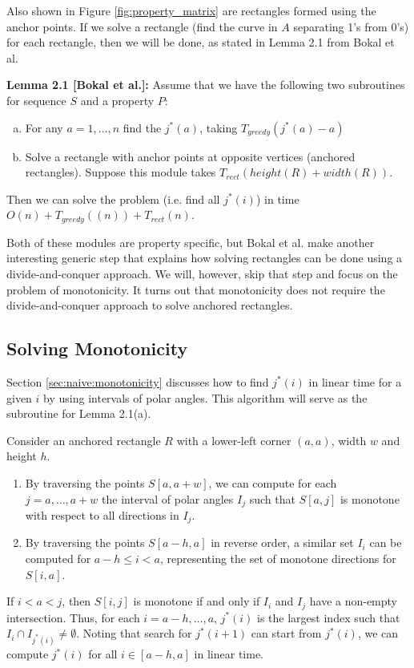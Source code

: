 \documentclass{article}
\begin{document}
Also shown in Figure \ref{fig:property_matrix} are rectangles formed
using the anchor points. If we solve a rectangle (find the curve
in $A$ separating 1's from 0's) for each rectangle, then we will
be done, as stated in Lemma 2.1 from Bokal et al.

\textbf{Lemma 2.1 [Bokal et al.]:} Assume that we have the following two subroutines for sequence $S$ and a property $P$:
\begin{enumerate}[(a)]
    \item For any $a = 1, \dots, n$ find the $j^*(a)$, taking $T_{greedy}(j^*(a) - a)$
    \item Solve a rectangle with anchor points at opposite vertices (anchored rectangles). Suppose this module takes $T_{rect}(height(R) + width(R))$.
\end{enumerate}
Then we can solve the problem (i.e. find all $j^*(i)$) in time $O(n) + T_{greedy}((n)) + T_{rect}(n)$.

Both of these modules are property specific, but Bokal et al. make
another interesting generic step that explains how solving rectangles
can be done using a divide-and-conquer approach. We will, however,
skip that step and focus on the problem of monotonicity. It turns
out that monotonicity does not require the divide-and-conquer
approach to solve anchored rectangles.

\subsection{Solving Monotonicity}
Section \ref{sec:naive:monotonicity} discusses how to find $j^*(i)$
in linear time for a given $i$ by using intervals of polar angles.
This algorithm will serve as the subroutine for Lemma 2.1(a).

Consider an anchored rectangle $R$ with a lower-left corner $(a, a)$, width $w$ and height $h$.
\begin{enumerate}[-]
	\item By traversing the points $S[a, a + w]$, we can compute
	for each $j = a, \dots, a + w$ the interval of polar angles
	$I_j$ such that $S[a, j]$ is monotone with respect to all
	directions in $I_j$.
	\item By traversing the points $S[a - h, a]$ in reverse
	order, a similar set $I_i$ can be computed for $a - h \leq
	i < a$, representing the set of monotone directions for
	$S[i, a]$.
\end{enumerate}

If $i < a < j$, then $S[i, j]$ is monotone if and only if $I_i$ and
$I_j$ have a non-empty intersection. Thus, for each $i = a - h,
\dots, a$, $j^*(i)$ is the largest index such that $I_i \cap
I_{j^*(i)} \neq \emptyset$.  Noting that search for $j^*(i+1)$ can
start from $j^*(i)$, we can compute $j^*(i)$ for all $i \in [a -
h, a]$ in linear time.
\end{document}
